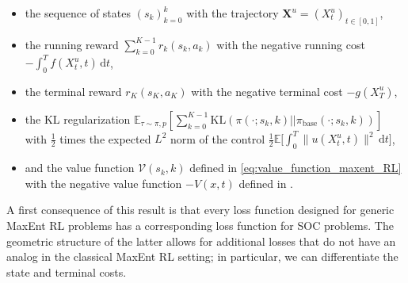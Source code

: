 \begin{proposition}
\begin{itemize}
    \item the sequence of states $(s_k)_{k=0}^{k}$ with the trajectory $\bm{X}^u = (X^u_t)_{t \in [0,1]}$,
    \item the running reward $\sum_{k=0}^{K-1} r_k(s_k,a_k)$ with the negative running cost $- \int_0^T f(X^u_t,t) \, \mathrm{d}t$, 
    \item the terminal reward $r_K(s_K,a_K)$ with the negative terminal cost $- 
    g(X^u_T)$, 
    \item the KL regularization $\mathbb{E}_{\tau \sim \pi,p}[\sum_{k=0}^{K-1} \mathrm{KL}(\pi(\cdot;s_k,k)||\pi_{\mathrm{base}}(\cdot;s_k,k))]$ with $\frac{1}{2}$ times the expected $L^2$ norm of the control $\frac{1}{2} \mathbb{E} \big[ \int_0^T 
   \|u(X^u_t,t)\|^2 \, \mathrm{d}t \big]$,
   \item and the value function $\mathcal{V}(s_k,k)$ defined in \eqref{eq:value_function_maxent_RL} with the negative value function $-V(x,t)$ defined in . 
   \end{itemize}
\end{proposition}

A first consequence of this result is that every loss function designed for generic MaxEnt RL problems has a corresponding loss function for SOC
problems. The geometric structure of the latter allows for additional losses that do not have an analog in the classical MaxEnt RL setting; in particular, we can differentiate the state and terminal costs. 



